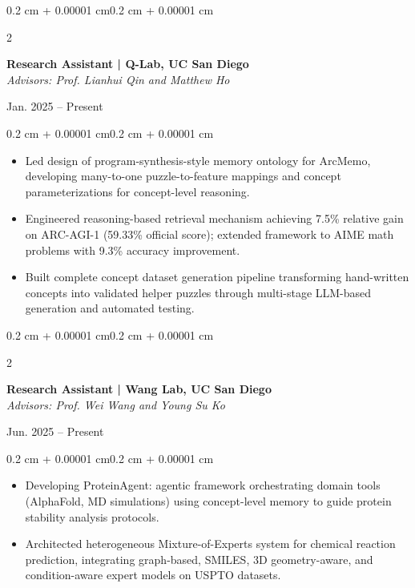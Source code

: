 \documentclass[10pt, letterpaper]{article}
\newenvironment{highlights}{
    \begin{itemize}[
        topsep=0.06 cm,
        parsep=0.06 cm,
        partopsep=0pt,
        itemsep=0pt,
        leftmargin=0.4 cm + 10pt
    ]
}{\end{itemize}}
\newenvironment{onecolentry}{
    \begin{adjustwidth}{0.2 cm + 0.00001 cm}{0.2 cm + 0.00001 cm}
}{\end{adjustwidth}}
\newenvironment{twocolentry}[2][]{
    \onecolentry
    \def\secondColumn{#2}
    \setcolumnwidth{\fill, 4.5 cm}
    \begin{paracol}{2}
}{
    \switchcolumn \raggedleft \secondColumn
    \end{paracol}
    \endonecolentry
}
\begin{document}
    \begin{twocolentry}{Jan. 2025 -- Present}
        \textbf{Research Assistant | Q-Lab, UC San Diego}\\
        \textit{Advisors: Prof. Lianhui Qin and Matthew Ho}
    \end{twocolentry}
    \vspace{0.06 cm}
    \begin{onecolentry}
        \begin{highlights}
            \item Led design of program-synthesis-style memory ontology for ArcMemo, developing many-to-one puzzle-to-feature mappings and concept parameterizations for concept-level reasoning.
            \item Engineered reasoning-based retrieval mechanism achieving 7.5\% relative gain on ARC-AGI-1 (59.33\% official score); extended framework to AIME math problems with 9.3\% accuracy improvement.
            \item Built complete concept dataset generation pipeline transforming hand-written concepts into validated helper puzzles through multi-stage LLM-based generation and automated testing.
        \end{highlights}
    \end{onecolentry}
    \vspace{0.12 cm}

    \begin{twocolentry}{Jun. 2025 -- Present}
        \textbf{Research Assistant | Wang Lab, UC San Diego}\\
        \textit{Advisors: Prof. Wei Wang and Young Su Ko}
    \end{twocolentry}
    \vspace{0.06 cm}
    \begin{onecolentry}
        \begin{highlights}
            \item Developing ProteinAgent: agentic framework orchestrating domain tools (AlphaFold, MD simulations) using concept-level memory to guide protein stability analysis protocols.
            \item Architected heterogeneous Mixture-of-Experts system for chemical reaction prediction, integrating graph-based, SMILES, 3D geometry-aware, and condition-aware expert models on USPTO datasets.
        \end{highlights}
    \end{onecolentry}
    \vspace{0.12 cm}
\end{document}
